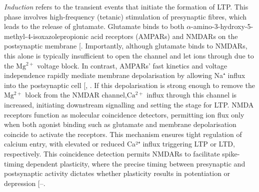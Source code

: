 \documentclass[
  11pt,
  letterpaper,
]{scrreprt}
\begin{document}
\emph{Induction} refers to the transient events that initiate the
formation of LTP. This phase involves high-frequency (tetanic)
stimulation of presynaptic fibres, which leads to the release of
glutamate. Glutamate binds to both
\(\alpha\)-amino-3-hydroxy-5-methyl-4-isoxazolepropionic acid receptors
(AMPARs) and NMDARs on the postsynaptic membrane
{[}\citeproc{ref-scheefhals2018Functional}{74}{]}. Importantly, although
glutamate binds to NMDARs, this alone is typically insufficient to open
the channel and let ions through due to the \(\mathrm{Mg^{2+}}\) voltage
block. In contrast, AMPARs' fast kinetics and voltage independence
rapidly mediate membrane depolarisation by allowing Na⁺ influx into the
postsynaptic cell {[},
\citeproc{ref-fuenzalida2010Role}{76}{]}. If this depolarisation is
strong enough to remove the \(\mathrm{Mg^{2+}}\) block from the NMDAR
channel,\(\mathrm{Ca^{2+}}\) influx through this channel is increased,
initiating downstream signalling and setting the stage for LTP. NMDA
receptors function as molecular coincidence detectors, permitting ion
flux only when both agonist binding such as glutamate and membrane
depolarisation coincide to activate the receptors. This mechanism
ensures tight regulation of calcium entry, with elevated or reduced Ca²⁺
influx triggering LTP or LTD, respectively. This coincidence detection
permits NMDARs to facilitate spike-timing dependent plasticity, where
the precise timing between presynaptic and postsynaptic activity
dictates whether plasticity results in potentiation or depression
{[}--\citeproc{ref-martinez-gallego2022Role}{79}{]}.
\end{document}

